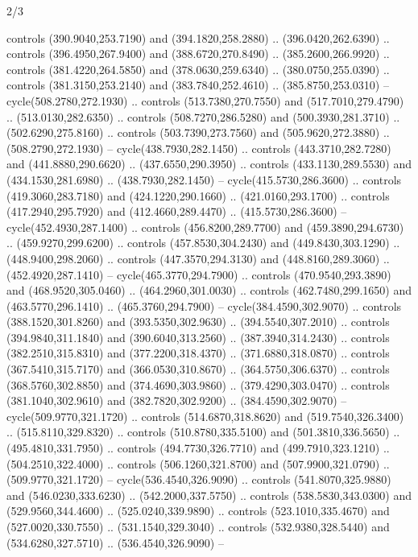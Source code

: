 \begin{flagdescription}{2/3}
\begin{scope}[xshift=0.5\flaglength]
\begin{scope}[scale=0.0021\flagwidth,yshift=167.8mm,xshift=-125.3mm]
\begin{scope}[y=-0.8pt, x=0.8pt, inner sep=0pt, outer sep=0pt]
  controls (390.9040,253.7190) and (394.1820,258.2880) .. (396.0420,262.6390) ..
  controls (396.4950,267.9400) and (388.6720,270.8490) .. (385.2600,266.9920) ..
  controls (381.4220,264.5850) and (378.0630,259.6340) .. (380.0750,255.0390) ..
  controls (381.3150,253.2140) and (383.7840,252.4610) .. (385.8750,253.0310) --
  cycle(508.2780,272.1930) .. controls (513.7380,270.7550) and
  (517.7010,279.4790) .. (513.0130,282.6350) .. controls (508.7270,286.5280) and
  (500.3930,281.3710) .. (502.6290,275.8160) .. controls (503.7390,273.7560) and
  (505.9620,272.3880) .. (508.2790,272.1930) -- cycle(438.7930,282.1450) ..
  controls (443.3710,282.7280) and (441.8880,290.6620) .. (437.6550,290.3950) ..
  controls (433.1130,289.5530) and (434.1530,281.6980) .. (438.7930,282.1450) --
  cycle(415.5730,286.3600) .. controls (419.3060,283.7180) and
  (424.1220,290.1660) .. (421.0160,293.1700) .. controls (417.2940,295.7920) and
  (412.4660,289.4470) .. (415.5730,286.3600) -- cycle(452.4930,287.1400) ..
  controls (456.8200,289.7700) and (459.3890,294.6730) .. (459.9270,299.6200) ..
  controls (457.8530,304.2430) and (449.8430,303.1290) .. (448.9400,298.2060) ..
  controls (447.3570,294.3130) and (448.8160,289.3060) .. (452.4920,287.1410) --
  cycle(465.3770,294.7900) .. controls (470.9540,293.3890) and
  (468.9520,305.0460) .. (464.2960,301.0030) .. controls (462.7480,299.1650) and
  (463.5770,296.1410) .. (465.3760,294.7900) -- cycle(384.4590,302.9070) ..
  controls (388.1520,301.8260) and (393.5350,302.9630) .. (394.5540,307.2010) ..
  controls (394.9840,311.1840) and (390.6040,313.2560) .. (387.3940,314.2430) ..
  controls (382.2510,315.8310) and (377.2200,318.4370) .. (371.6880,318.0870) ..
  controls (367.5410,315.7170) and (366.0530,310.8670) .. (364.5750,306.6370) ..
  controls (368.5760,302.8850) and (374.4690,303.9860) .. (379.4290,303.0470) ..
  controls (381.1040,302.9610) and (382.7820,302.9200) .. (384.4590,302.9070) --
  cycle(509.9770,321.1720) .. controls (514.6870,318.8620) and
  (519.7540,326.3400) .. (515.8110,329.8320) .. controls (510.8780,335.5100) and
  (501.3810,336.5650) .. (495.4810,331.7950) .. controls (494.7730,326.7710) and
  (499.7910,323.1210) .. (504.2510,322.4000) .. controls (506.1260,321.8700) and
  (507.9900,321.0790) .. (509.9770,321.1720) -- cycle(536.4540,326.9090) ..
  controls (541.8070,325.9880) and (546.0230,333.6230) .. (542.2000,337.5750) ..
  controls (538.5830,343.0300) and (529.9560,344.4600) .. (525.0240,339.9890) ..
  controls (523.1010,335.4670) and (527.0020,330.7550) .. (531.1540,329.3040) ..
  controls (532.9380,328.5440) and (534.6280,327.5710) .. (536.4540,326.9090) --

\end{scope}
\end{scope}
\end{scope}
\end{flagdescription}
